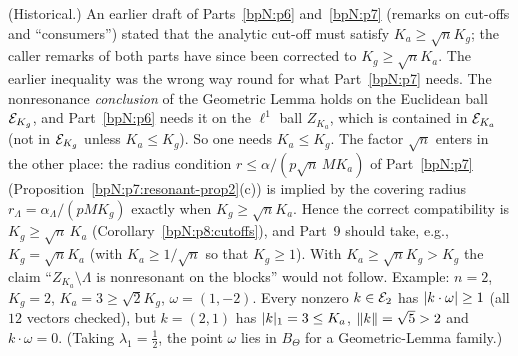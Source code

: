 \begin{remark}\label{bpN:p8:direction}
(Historical.) An earlier draft of Parts~\ref{bpN:p6} and~\ref{bpN:p7} (remarks on cut-offs and ``consumers'') stated that the analytic cut-off must satisfy $K_a\ge\sqrt nK_g$; the caller remarks of both parts have since been corrected to $K_g\ge\sqrt nK_a$. The earlier inequality was the wrong way round for what Part~\ref{bpN:p7} needs. The nonresonance \emph{conclusion} of the Geometric Lemma holds on the Euclidean ball $\mathcal E_{K_g}$, and Part~\ref{bpN:p6} needs it on the $\ell^1$ ball $Z_{K_a}$, which is contained in $\mathcal E_{K_a}$ (not in $\mathcal E_{K_g}$ unless $K_a\le K_g$). So one needs $K_a\le K_g$. The factor $\sqrt n$ enters in the other place: the radius condition $r\le\alpha/(p\sqrt n\,MK_a)$ of Part~\ref{bpN:p7} (Proposition~\ref{bpN:p7:resonant-prop2}(c)) is implied by the covering radius $r_\Lambda=\alpha_\Lambda/(pMK_g)$ exactly when $K_g\ge\sqrt nK_a$. Hence the correct compatibility is $K_g\ge\sqrt n\,K_a$ (Corollary~\ref{bpN:p8:cutoffs}), and Part~9 should take, e.g., $K_g=\sqrt nK_a$ (with $K_a\ge1/\sqrt n$ so that $K_g\ge1$). With $K_a\ge\sqrt nK_g>K_g$ the claim ``$Z_{K_a}\setminus\Lambda$ is nonresonant on the blocks'' would not follow. Example: $n=2$, $K_g=2$, $K_a=3\ge\sqrt2K_g$, $\omega=(1,-2)$. Every nonzero $k\in\mathcal E_2$ has $\lvert k\cdot\omega\rvert\ge1$ (all $12$ vectors checked), but $k=(2,1)$ has $\lvert k\rvert_1=3\le K_a$, $\lVert k\rVert=\sqrt5>2$ and $k\cdot\omega=0$. (Taking $\lambda_1=\tfrac12$, the point $\omega$ lies in $B_\Theta$ for a Geometric-Lemma family.)
\end{remark}

